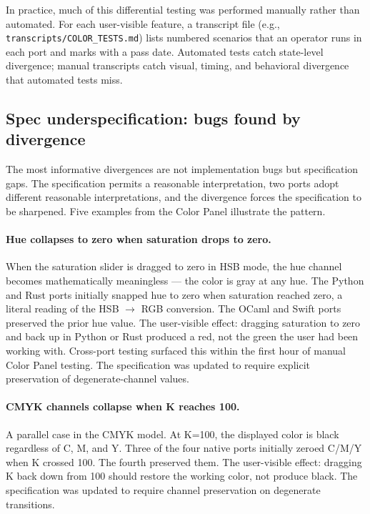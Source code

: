 \documentclass[10pt]{article}
\begin{document}
In practice, much of this differential testing was performed manually
rather than automated. For each user-visible feature, a transcript file
(e.g., \texttt{transcripts/COLOR\_TESTS.md}) lists numbered scenarios that
an operator runs in each port and marks with a pass date. Automated tests
catch state-level divergence; manual transcripts catch visual, timing, and
behavioral divergence that automated tests miss.

\subsection{Spec underspecification: bugs found by divergence}
\label{sec:vignettes}

The most informative divergences are not implementation bugs but
specification gaps. The specification permits a reasonable interpretation,
two ports adopt different reasonable interpretations, and the divergence
forces the specification to be sharpened. Five examples from the Color
Panel illustrate the pattern.

\paragraph{Hue collapses to zero when saturation drops to zero.} When the
saturation slider is dragged to zero in HSB mode, the hue channel becomes
mathematically meaningless --- the color is gray at any hue. The Python
and Rust ports initially snapped hue to zero when saturation reached
zero, a literal reading of the HSB $\rightarrow$ RGB conversion. The
OCaml and Swift ports preserved the prior hue value. The user-visible
effect: dragging saturation to zero and back up in Python or Rust
produced a red, not the green the user had been working with. Cross-port
testing surfaced this within the first hour of manual Color Panel
testing. The specification was updated to require explicit preservation
of degenerate-channel values.

\paragraph{CMYK channels collapse when K reaches 100.} A parallel case in
the CMYK model. At K=100, the displayed color is black regardless of C,
M, and Y. Three of the four native ports initially zeroed C/M/Y when K
crossed 100. The fourth preserved them. The user-visible effect: dragging
K back down from 100 should restore the working color, not produce black.
The specification was updated to require channel preservation on
degenerate transitions.
\end{document}

